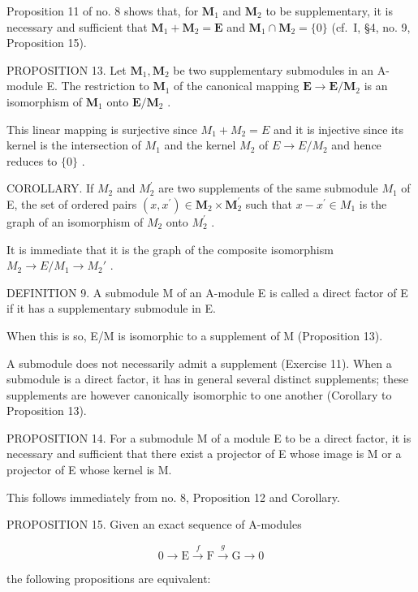 Proposition 11 of no. 8 shows that, for \(\mathbf{M}_1\) and \(\mathbf{M}_2\) to be supplementary, it is necessary and sufficient that \(\mathbf{M}_1 + \mathbf{M}_2 = \mathbf{E}\) and \(\mathbf{M}_1 \cap \mathbf{M}_2 = \{0\}\) (cf.~I, §4, no. 9, Proposition 15).

PROPOSITION 13. Let \(\mathbf{M}_1, \mathbf{M}_2\) be two supplementary submodules in an A-module E. The restriction to \(\mathbf{M}_1\) of the canonical mapping \(\mathbf{E} \to \mathbf{E} / \mathbf{M}_2\) is an isomorphism of \(\mathbf{M}_1\) onto \(\mathbf{E} / \mathbf{M}_2\) .

This linear mapping is surjective since \(M_{1} + M_{2} = E\) and it is injective since its kernel is the intersection of \(M_{1}\) and the kernel \(M_{2}\) of \(E \rightarrow E/M_{2}\) and hence reduces to \(\{0\}\) .

COROLLARY. If \(M_{2}\) and \(M_{2}^{\prime}\) are two supplements of the same submodule \(M_{1}\) of E, the set of ordered pairs \((x, x^{\prime}) \in \mathbf{M}_{2} \times \mathbf{M}_{2}^{\prime}\) such that \(x - x^{\prime} \in M_{1}\) is the graph of an isomorphism of \(M_{2}\) onto \(M_{2}^{\prime}\) .

It is immediate that it is the graph of the composite isomorphism \(M_{2} \rightarrow E/M_{1} \rightarrow M_{2}'\) .

DEFINITION 9. A submodule M of an A-module E is called a direct factor of E if it has a supplementary submodule in E.

When this is so, E/M is isomorphic to a supplement of M (Proposition 13).

A submodule does not necessarily admit a supplement (Exercise 11). When a submodule is a direct factor, it has in general several distinct supplements; these supplements are however canonically isomorphic to one another (Corollary to Proposition 13).

PROPOSITION 14. For a submodule M of a module E to be a direct factor, it is necessary and sufficient that there exist a projector of E whose image is M or a projector of E whose kernel is M.

This follows immediately from no. 8, Proposition 12 and Corollary.

PROPOSITION 15. Given an exact sequence of A-modules

\[
0 \longrightarrow \mathrm{E} \stackrel {f} {\longrightarrow} \mathrm{F} \stackrel {g} {\longrightarrow} \mathrm{G} \longrightarrow 0\tag{33}
\]

the following propositions are equivalent:

